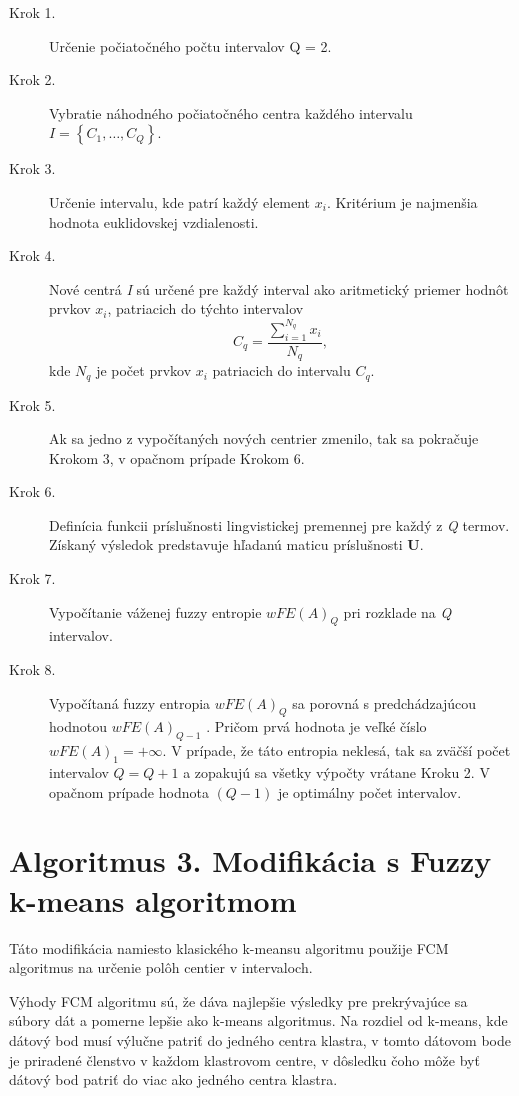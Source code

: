 \begin{description}
\item[{Krok 1.}]   Určenie počiatočného počtu intervalov Q = 2. 
\item[{Krok 2.}] Vybratie náhodného počiatočného centra každého intervalu $ I = \left\{C_1, \ldots, C_Q\right\}$. 

 \item[{Krok 3.}]  Určenie intervalu, kde patrí každý element $x_i$. Kritérium je najmenšia hodnota euklidovskej vzdialenosti.

  \item[{Krok 4.}]
  Nové centrá \textit{I} sú určené pre každý interval ako aritmetický priemer hodnôt prvkov $x_i$, patriacich do týchto intervalov
  $$
  C_q = \frac{ \sum\limits_{i=1}^{N_q} x_i }{N_q} , 
  $$
  kde $N_q$ je počet prvkov $x_i$ patriacich do intervalu $C_q$.  
   \item[{Krok 5.}] Ak sa jedno z vypočítaných nových centrier zmenilo, tak sa pokračuje Krokom 3, v opačnom prípade Krokom 6. 
   
   
    \item[{Krok 6.}] Definícia funkcii príslušnosti lingvistickej premennej pre každý z \textit{Q} termov. Získaný výsledok predstavuje hľadanú maticu príslušnosti \textbf{U}. 
    
    
\item[{Krok 7.}] 
 Vypočítanie váženej fuzzy entropie $wFE(A)_Q$ pri rozklade na \textit{Q} intervalov. 
 
 \item[{Krok 8.}] 
 Vypočítaná fuzzy entropia $wFE(A)_Q$  sa porovná s predchádzajúcou hodnotou $wFE(A)_{Q-1}$ . Pričom prvá hodnota je veľké číslo $wFE(A)_1=+\infty$. 
 V prípade, že táto entropia neklesá, tak sa zväčší počet intervalov $Q=Q+1$ a zopakujú sa všetky výpočty vrátane Kroku 2. 
 V opačnom prípade hodnota \textit{$(Q-1)$} je optimálny počet intervalov. \cite{levashenkoProj}
\end{description}


\section{Algoritmus 3. Modifikácia s Fuzzy k-means algoritmom}

Táto modifikácia namiesto klasického k-meansu algoritmu použije FCM algoritmus na určenie polôh centier v intervaloch. 

Výhody FCM algoritmu sú, že dáva najlepšie výsledky pre prekrývajúce sa súbory dát a pomerne lepšie ako k-means algoritmus.  Na rozdiel od k-means, kde dátový bod musí výlučne patriť do jedného centra klastra, v tomto dátovom bode je priradené členstvo v každom klastrovom centre, v dôsledku čoho môže byť dátový bod patriť do viac ako jedného centra klastra.

